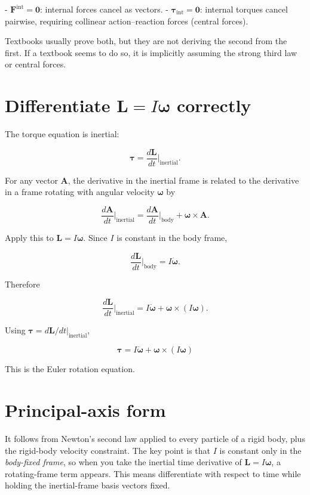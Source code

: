 \documentclass[a4paper,11pt]{article}
\begin{document}
- \(\mathbf F^{\mathrm{int}}=\mathbf 0\): internal forces cancel as vectors.
- \(\boldsymbol\tau_{\mathrm{int}}=\mathbf 0\): internal torques cancel pairwise,
  requiring collinear action–reaction forces (central forces).

Textbooks usually prove both, but they are not deriving the second from the first.
If a textbook seems to do so, it is implicitly assuming the strong third law or central forces.

\section{Differentiate \(\mathbf L=I\boldsymbol\omega\) correctly}

The torque equation is inertial:

\[
\boldsymbol\tau=
\frac{d\mathbf L}{dt}\bigg|_{\text{inertial}}.
\]

For any vector \(\mathbf A\), the derivative in the inertial frame is related
to the derivative in a frame rotating with angular velocity
\(\boldsymbol\omega\) by

\[
\frac{d\mathbf A}{dt}\bigg|_{\text{inertial}}
=
\frac{d\mathbf A}{dt}\bigg|_{\text{body}}
+
\boldsymbol\omega\times\mathbf A.
\]

Apply this to \(\mathbf L=I\boldsymbol\omega\). Since \(I\) is constant in the body frame,

\[
\frac{d\mathbf L}{dt}\bigg|_{\text{body}}
=
I\dot{\boldsymbol\omega}.
\]

Therefore

\[
\frac{d\mathbf L}{dt}\bigg|_{\text{inertial}}
=
I\dot{\boldsymbol\omega}
+
\boldsymbol\omega\times(I\boldsymbol\omega).
\]

Using \(\boldsymbol\tau=d\mathbf L/dt|_{\text{inertial}}\),

\[
\boxed{
\boldsymbol\tau
=
I\dot{\boldsymbol\omega}
+
\boldsymbol\omega\times(I\boldsymbol\omega)
}
\]

This is the Euler rotation equation.

\section{Principal-axis form}

It follows from Newton’s second law applied to every particle of a rigid body,
plus the rigid-body velocity constraint. The key point is that $I$ is
constant only in the \emph{body-fixed frame}, so when you take the inertial time
derivative of \(\mathbf L=I\boldsymbol\omega\), a rotating-frame term appears.
This means differentiate with respect to time while holding the inertial-frame basis
vectors fixed.
\end{document}

